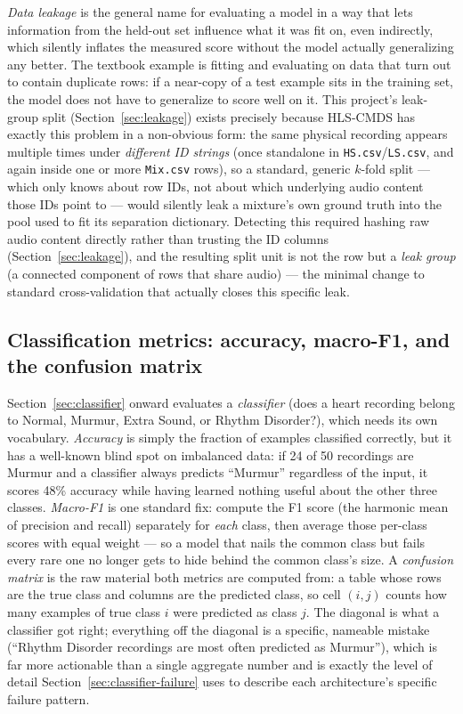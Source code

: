 \documentclass[11pt]{article}
\begin{document}
\emph{Data leakage} is the general name for evaluating a model in a way
that lets information from the held-out set influence what it was fit on,
even indirectly, which silently inflates the measured score without the
model actually generalizing any better. The textbook example is fitting
and evaluating on data that turn out to contain duplicate rows: if a
near-copy of a test example sits in the training set, the model does not
have to generalize to score well on it. This project's leak-group split
(Section~\ref{sec:leakage}) exists precisely because HLS-CMDS has exactly
this problem in a non-obvious form: the same physical recording appears
multiple times under \emph{different ID strings} (once standalone in
\texttt{HS.csv}/\texttt{LS.csv}, and again inside one or more
\texttt{Mix.csv} rows), so a standard, generic $k$-fold split --- which
only knows about row IDs, not about which underlying audio content those
IDs point to --- would silently leak a mixture's own ground truth into the
pool used to fit its separation dictionary. Detecting this required
hashing raw audio content directly rather than trusting the ID columns
(Section~\ref{sec:leakage}), and the resulting split unit is not the row
but a \emph{leak group} (a connected component of rows that share
audio) --- the minimal change to standard cross-validation that actually
closes this specific leak.

\subsection{Classification metrics: accuracy, macro-F1, and the confusion matrix}
\label{sec:bg-classmetrics}

Section~\ref{sec:classifier} onward evaluates a \emph{classifier} (does a
heart recording belong to Normal, Murmur, Extra Sound, or Rhythm
Disorder?), which needs its own vocabulary. \emph{Accuracy} is simply the
fraction of examples classified correctly, but it has a well-known blind
spot on imbalanced data: if 24 of 50 recordings are Murmur and a
classifier always predicts ``Murmur'' regardless of the input, it scores
48\% accuracy while having learned nothing useful about the other three
classes. \emph{Macro-F1} is one standard fix: compute the F1 score
(the harmonic mean of precision and recall) separately for \emph{each}
class, then average those per-class scores with equal weight --- so a
model that nails the common class but fails every rare one no longer gets
to hide behind the common class's size. A \emph{confusion matrix} is the
raw material both metrics are computed from: a table whose rows are the
true class and columns are the predicted class, so cell $(i,j)$ counts how
many examples of true class $i$ were predicted as class $j$. The diagonal
is what a classifier got right; everything off the diagonal is a specific,
nameable mistake (``Rhythm Disorder recordings are most often predicted as
Murmur''), which is far more actionable than a single aggregate number and
is exactly the level of detail Section~\ref{sec:classifier-failure} uses
to describe each architecture's specific failure pattern.
\end{document}
